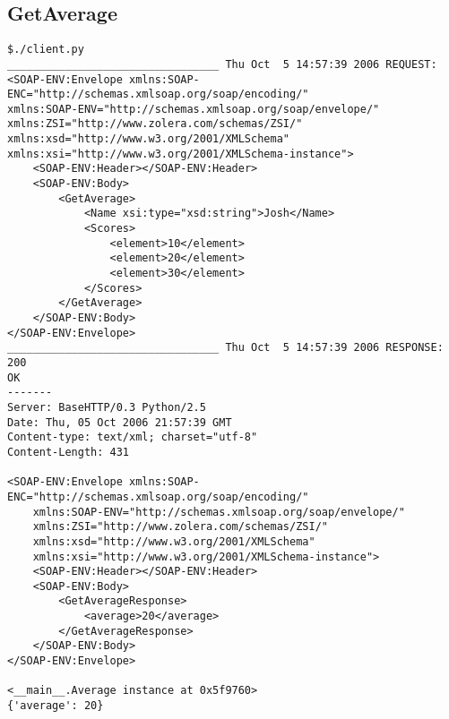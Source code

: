 \subsection{GetAverage} 
\begin{verbatim}
$./client.py 
_________________________________ Thu Oct  5 14:57:39 2006 REQUEST:
<SOAP-ENV:Envelope xmlns:SOAP-ENC="http://schemas.xmlsoap.org/soap/encoding/" 
xmlns:SOAP-ENV="http://schemas.xmlsoap.org/soap/envelope/" 
xmlns:ZSI="http://www.zolera.com/schemas/ZSI/" 
xmlns:xsd="http://www.w3.org/2001/XMLSchema" 
xmlns:xsi="http://www.w3.org/2001/XMLSchema-instance">
	<SOAP-ENV:Header></SOAP-ENV:Header>
	<SOAP-ENV:Body>
		<GetAverage>
			<Name xsi:type="xsd:string">Josh</Name>
			<Scores>
				<element>10</element>
				<element>20</element>
				<element>30</element>
			</Scores>
		</GetAverage>
	</SOAP-ENV:Body>
</SOAP-ENV:Envelope>
_________________________________ Thu Oct  5 14:57:39 2006 RESPONSE:
200
OK
-------
Server: BaseHTTP/0.3 Python/2.5
Date: Thu, 05 Oct 2006 21:57:39 GMT
Content-type: text/xml; charset="utf-8"
Content-Length: 431

<SOAP-ENV:Envelope xmlns:SOAP-ENC="http://schemas.xmlsoap.org/soap/encoding/" 
	xmlns:SOAP-ENV="http://schemas.xmlsoap.org/soap/envelope/" 
	xmlns:ZSI="http://www.zolera.com/schemas/ZSI/" 
	xmlns:xsd="http://www.w3.org/2001/XMLSchema" 
	xmlns:xsi="http://www.w3.org/2001/XMLSchema-instance">
	<SOAP-ENV:Header></SOAP-ENV:Header>
	<SOAP-ENV:Body>
		<GetAverageResponse>
			<average>20</average>
		</GetAverageResponse>
	</SOAP-ENV:Body>
</SOAP-ENV:Envelope>

<__main__.Average instance at 0x5f9760>
{'average': 20}
\end{verbatim}


